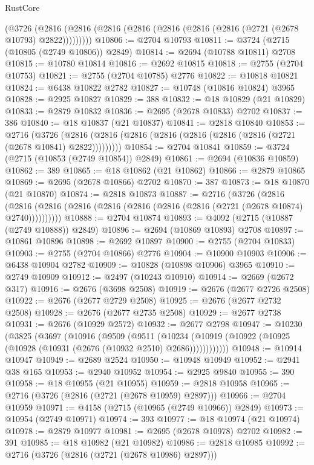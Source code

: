 \begin{lexlean}{RustCore}
\begin{coremodule}
    (@3726 (@2816 (@2816 (@2816 (@2816 (@2816 (@2816 (@2816 (@2721 (@2678 @10793) @2822)))))))))
@10806 := @2704 @10793
@10811 := @3724 (@2715 (@10805 (@2749 @10806)) @2849)
@10814 := @2694 (@10788 @10811) @2708
@10815 := @10780 @10814
@10816 := @2692 @10815
@10818 := @2755 (@2704 @10753)
@10821 := @2755 (@2704 @10785) @2776
@10822 := @10818 @10821
@10824 := @6438 @10822 @2782
@10827 := @10748 (@10816 @10824) @3965
@10828 := @2925 @10827
@10829 := 388
@10832 := @18 @10829 (@21 @10829)
@10833 := @2879 @10832
@10836 := @2695 (@2678 @10833) @2702
@10837 := 386
@10840 := @18 @10837 (@21 @10837)
@10841 := @2818 @10840
@10853 := @2716
    (@3726 (@2816 (@2816 (@2816 (@2816 (@2816 (@2816 (@2816 (@2721 (@2678 @10841) @2822)))))))))
@10854 := @2704 @10841
@10859 := @3724 (@2715 (@10853 (@2749 @10854)) @2849)
@10861 := @2694 (@10836 @10859)
@10862 := 389
@10865 := @18 @10862 (@21 @10862)
@10866 := @2879 @10865
@10869 := @2695 (@2678 @10866) @2702
@10870 := 387
@10873 := @18 @10870 (@21 @10870)
@10874 := @2818 @10873
@10887 := @2716
    (@3726
      (@2816 (@2816 (@2816 (@2816 (@2816 (@2816 (@2816 (@2816 (@2721 (@2678 @10874) @2740))))))))))
@10888 := @2704 @10874
@10893 := @4092 (@2715 (@10887 (@2749 @10888)) @2849)
@10896 := @2694 (@10869 @10893) @2708
@10897 := @10861 @10896
@10898 := @2692 @10897
@10900 := @2755 (@2704 @10833)
@10903 := @2755 (@2704 @10866) @2776
@10904 := @10900 @10903
@10906 := @6438 @10904 @2782
@10909 := @10828 (@10898 @10906) @3965
@10910 := @2749 @10909
@10912 := @2497 (@10243 @10910)
@10914 := @2669 (@2672 @317)
@10916 := @2676 (@3698 @2508)
@10919 := @2676 (@2677 @2726 @2508)
@10922 := @2676 (@2677 @2729 @2508)
@10925 := @2676 (@2677 @2732 @2508)
@10928 := @2676 (@2677 @2735 @2508)
@10929 := @2677 @2738
@10931 := @2676 (@10929 @2572)
@10932 := @2677 @2798
@10947 := @10230
    (@3825
      (@3697
        (@10916
          (@9509
            (@9511
              (@10234
                (@10919 (@10922 (@10925 (@10928 (@10931 (@2676 (@10932 @2510) @2686))))))))))))
@10948 := @10914 @10947
@10949 := @2689 @2524
@10950 := @10948 @10949
@10952 := @2941 @38 @165
@10953 := @2940 @10952
@10954 := @2925 @9840
@10955 := 390
@10958 := @18 @10955 (@21 @10955)
@10959 := @2818 @10958
@10965 := @2716 (@3726 (@2816 (@2721 (@2678 @10959) @2897)))
@10966 := @2704 @10959
@10971 := @4158 (@2715 (@10965 (@2749 @10966)) @2849)
@10973 := @10954 (@2749 @10971)
@10974 := 393
@10977 := @18 @10974 (@21 @10974)
@10978 := @2879 @10977
@10981 := @2695 (@2678 @10978) @2702
@10982 := 391
@10985 := @18 @10982 (@21 @10982)
@10986 := @2818 @10985
@10992 := @2716 (@3726 (@2816 (@2721 (@2678 @10986) @2897)))

\end{coremodule}
\end{lexlean}

